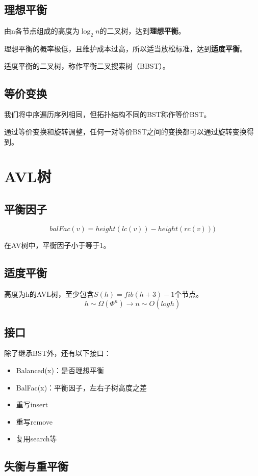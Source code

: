 \documentclass{article}
\begin{document}
\subsection{理想平衡}
由n各节点组成的高度为$\log_2n$的二叉树，达到\textbf{理想平衡}。

理想平衡的概率极低，且维护成本过高，所以适当放松标准，达到\textbf{适度平衡}。

适度平衡的二叉树，称作平衡二叉搜索树（BBST）。

\subsection{等价变换}

我们将中序遍历序列相同，但拓扑结构不同的BST称作等价BST。

通过等价变换和旋转调整，任何一对等价BST之间的变换都可以通过旋转变换得到。

\section{AVL树}
\subsection{平衡因子}

$$balFac(v) = height(lc(v)) - height(rc(v)))$$

在AV树中，平衡因子小于等于1。

\subsection{适度平衡}

高度为h的AVL树，至少包含$S(h) = fib(h+3) - 1$个节点。
$$h \sim \Omega(\Phi^n) \rightarrow n \sim O(log_{}h)$$

\subsection{接口}
除了继承BST外，还有以下接口：
\begin{itemize}
  \item Balanced(x)：是否理想平衡
  \item BalFac(x)：平衡因子，左右子树高度之差
  \item 重写insert
  \item 重写remove
  \item 复用search等
\end{itemize}

\subsection{失衡与重平衡}
\end{document}

